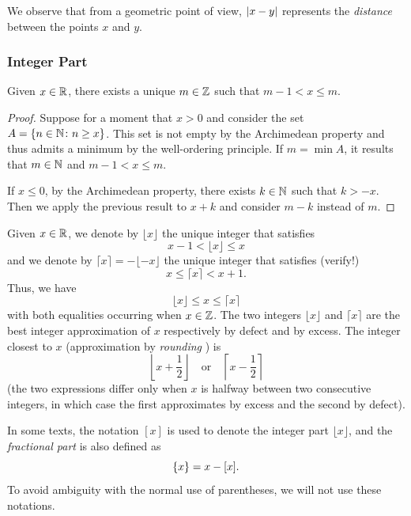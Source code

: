We observe that from a geometric point of view,
${\left|x-y\right|}$ represents the \emph{distance} between the points
$x$ and $y$.

\subsubsection{Integer Part}

\begin{theorem}
\mymark{*}%
  Given $x\in {\mathbb R}$, there exists a unique $m\in {\mathbb Z}$ such that $m-1 < x \le m$.
\end{theorem}
%
\begin{proof}
  Suppose for a moment that $x > 0$
  and consider the set $A={\left\{ n \in {\mathbb N} \colon n\ge x \right\}}$.
  This set is not empty by the Archimedean property 
  and thus admits a minimum by the well-ordering principle.
  If $m=\min A$, it results that $m\in {\mathbb N}$ and $m-1< x \le m$.

  If $x\le 0$, by the Archimedean property, there exists $k\in {\mathbb N}$ such that 
  $k>-x$. Then we apply the previous result to $x+k$ and consider 
  $m-k$ instead of $m$.
\end{proof}

\begin{definition}
  \mymark{**}%
%
  Given $x\in {\mathbb R}$, we denote by $\lfloor x\rfloor$ the unique integer
  that satisfies
  \mymargin{$\lfloor\cdot\rfloor$} %
  \[
    x - 1 < \lfloor x \rfloor \le x
  \]
    and we denote by $\lceil x \rceil = - \lfloor -x \rfloor$ the unique integer
  that satisfies (verify!)
  \mymargin{$\lceil\cdot\rceil$} %
  \[
    x \le \lceil x \rceil < x + 1.
  \]
  Thus, we have
  \[
    \lfloor x \rfloor \le x \le \lceil x \rceil
  \]
  with both equalities occurring when $x\in {\mathbb Z}$.
  The two integers $\lfloor x \rfloor$ and $\lceil x \rceil$
  are the best integer approximation of $x$ respectively
  by defect and by excess.
  The integer closest to $x$ (approximation by \emph{rounding}%
%
)
  is
  \[
    \left\lfloor x + \frac 1 2 \right\rfloor
  \quad \text{or} \quad
    \left\lceil x-\frac 1 2 \right\rceil
  \]
  (the two expressions differ only when $x$ is halfway between 
    two consecutive integers, in which case the first approximates by excess and
  the second
  by defect).
\end{definition}

In some texts, the notation $[x]$ is used to denote the integer part $\lfloor x
\rfloor$, and the \emph{fractional part} is also defined as
\[
  {\left\{ x \right\}} = x - [x].
\]
To avoid ambiguity with the normal use of parentheses, we will not use these
notations.

